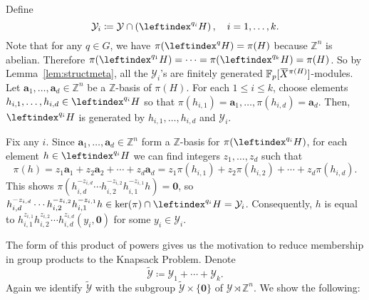 \documentclass[a4paper,UKenglish,cleveref, autoref, thm-restate]{lipics-v2021}
\newcommand{\Z}{\mathbb{Z}}
\newcommand{\F}{\mathbb{F}}
\newcommand{\mY}{\mathcal{Y}}
\newcommand{\tY}{\widetilde{\mathcal{Y}}}
\newcommand{\ba}{\boldsymbol{a}}
\newcommand{\bzer}{\boldsymbol{0}}
\newcommand{\oX}{\mkern 1.5mu\overline{\mkern-1.5mu X \mkern-1.5mu}\mkern 1.5mu}
\theoremstyle{definition}
\theoremstyle{definition}
\theoremstyle{definition}
\begin{document}
Define
\[
\mY_i \coloneqq \mY \cap \left(\leftindex^{q_i}{H}\right), \quad i = 1, \ldots, k.
\]
Note that for any $q \in G$, we have $\pi(\leftindex^{q}{H}) = \pi(H)$ because $\Z^n$ is abelian. Therefore $\pi(\leftindex^{q_1}{H}) = \cdots = \pi(\leftindex^{q_k}{H}) = \pi(H)$.
So by Lemma~\ref{lem:structmeta}, all the $\mY_i$'s are finitely generated $\F_p[\oX^{\pi(H)}]$-modules.
Let $\ba_1, \ldots, \ba_{d} \in \Z^n$ be a $\Z$-basis of $\pi(H)$.
For each $1 \leq i \leq k$, choose elements $h_{i,1}, \ldots, h_{i,d} \in \leftindex^{q_i}{H}$ so that $\pi(h_{i,1}) = \ba_1, \ldots, \pi(h_{i,d}) = \ba_d$.
Then, $\leftindex^{q_i}{H}$ is generated by $h_{i,1}, \ldots, h_{i,d}$ and $\mY_i$.

Fix any $i$. Since $\ba_1, \ldots, \ba_{d} \in \Z^n$ form a $\Z$-basis for $\pi(\leftindex^{q_i}{H})$, for each element $h \in \leftindex^{q_i}{H}$ we can find integers $z_1, \ldots, z_d$ such that 
\[
\pi(h) = z_1 \ba_1 + z_2 \ba_2 + \cdots + z_d \ba_d = z_1 \pi(h_{i,1}) + z_2 \pi(h_{i,2}) + \cdots + z_d \pi(h_{i,d}).
\]
This shows $\pi(h_{i, d}^{- z_{i, d}} \cdots h_{i, 2}^{- z_{i, 2}} h_{i, 1}^{- z_{i, 1}} h) = \bzer$, so $h_{i, d}^{- z_{i, d}} \cdots h_{i, 2}^{- z_{i, 2}} h_{i, 1}^{- z_{i, 1}} h \in \ker(\pi) \cap \leftindex^{q_i}{H} = \mY_i$.
Consequently, $h$ is equal to $h_{i,1}^{z_{i, 1}} h_{i,2}^{z_{i, 2}} \cdots h_{i,d}^{z_{i, d}} (y_i, \bzer)$ for some $y_i \in \mY_i$.

The form of this product of powers gives us the motivation to reduce membership in group products to the Knapsack Problem. 
Denote
\[
\tY \coloneqq \mY_1 + \cdots + \mY_k.
\]
Again we identify $\tY$ with the subgroup $\tY \times \{\bzer\}$ of $\mY \rtimes \Z^n$. We show the following:
\end{document}
